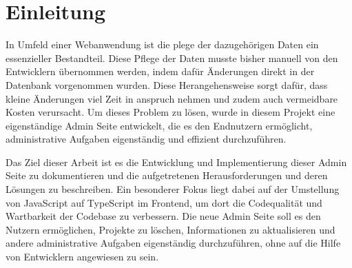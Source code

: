 \section{Einleitung}
In Umfeld einer Webanwendung ist die plege der dazugehörigen Daten ein essenzieller Bestandteil.
Diese Pflege der Daten musste bisher manuell von den Entwicklern übernommen werden, indem dafür Änderungen direkt in der Datenbank vorgenommen wurden.
Diese Herangehensweise sorgt dafür, dass kleine Änderungen viel Zeit in anspruch nehmen und zudem auch vermeidbare Kosten verursacht.
Um dieses Problem zu lösen, wurde in diesem Projekt eine eigenständige Admin Seite entwickelt, die es den Endnutzern ermöglicht, administrative Aufgaben eigenständig und effizient durchzuführen.

Das Ziel dieser Arbeit ist es die Entwicklung und Implementierung dieser Admin Seite zu dokumentieren und die aufgetretenen Herausforderungen und deren Lösungen zu beschreiben.
Ein besonderer Fokus liegt dabei auf der Umstellung von JavaScript auf TypeScript im Frontend, um dort die Codequalität und Wartbarkeit der Codebase zu verbessern.
Die neue Admin Seite soll es den Nutzern ermöglichen, Projekte zu löschen, Informationen zu aktualisieren und andere administrative Aufgaben eigenständig durchzuführen, ohne auf die Hilfe von Entwicklern angewiesen zu sein.

